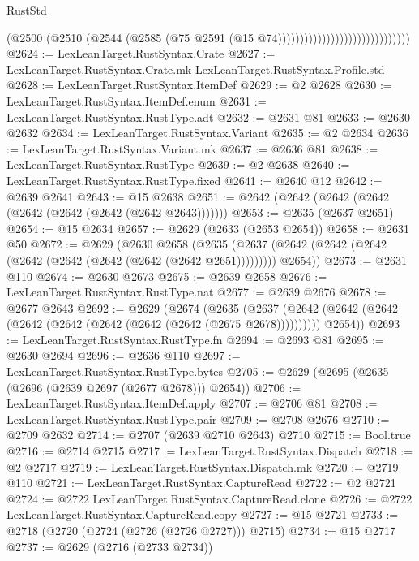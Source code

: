 \begin{lexlean}{RustStd}
\begin{coremodule}
{\begin{coremodule}
{{{{{{{{{{{{{{{{{{{{{{{{{{{{{{{{{                                                    (@2500
                                                      (@2510
                                                        (@2544
                                                          (@2585
                                                            (@75
                                                              @2591
                                                              (@15 @74))))))))))))))))))))))))))))))
@2624 := LexLeanTarget.RustSyntax.Crate
@2627 := LexLeanTarget.RustSyntax.Crate.mk LexLeanTarget.RustSyntax.Profile.std
@2628 := LexLeanTarget.RustSyntax.ItemDef
@2629 := @2 @2628
@2630 := LexLeanTarget.RustSyntax.ItemDef.enum
@2631 := LexLeanTarget.RustSyntax.RustType.adt
@2632 := @2631 @81
@2633 := @2630 @2632
@2634 := LexLeanTarget.RustSyntax.Variant
@2635 := @2 @2634
@2636 := LexLeanTarget.RustSyntax.Variant.mk
@2637 := @2636 @81
@2638 := LexLeanTarget.RustSyntax.RustType
@2639 := @2 @2638
@2640 := LexLeanTarget.RustSyntax.RustType.fixed
@2641 := @2640 @12
@2642 := @2639 @2641
@2643 := @15 @2638
@2651 := @2642 (@2642 (@2642 (@2642 (@2642 (@2642 (@2642 (@2642 @2643)))))))
@2653 := @2635 (@2637 @2651)
@2654 := @15 @2634
@2657 := @2629 (@2633 (@2653 @2654))
@2658 := @2631 @50
@2672 := @2629
    (@2630
      @2658
      (@2635 (@2637 (@2642 (@2642 (@2642 (@2642 (@2642 (@2642 (@2642 (@2642 @2651))))))))) @2654))
@2673 := @2631 @110
@2674 := @2630 @2673
@2675 := @2639 @2658
@2676 := LexLeanTarget.RustSyntax.RustType.nat
@2677 := @2639 @2676
@2678 := @2677 @2643
@2692 := @2629
    (@2674
      (@2635
        (@2637 (@2642 (@2642 (@2642 (@2642 (@2642 (@2642 (@2642 (@2642 (@2675 @2678))))))))))
        @2654))
@2693 := LexLeanTarget.RustSyntax.RustType.fn
@2694 := @2693 @81
@2695 := @2630 @2694
@2696 := @2636 @110
@2697 := LexLeanTarget.RustSyntax.RustType.bytes
@2705 := @2629 (@2695 (@2635 (@2696 (@2639 @2697 (@2677 @2678))) @2654))
@2706 := LexLeanTarget.RustSyntax.ItemDef.apply
@2707 := @2706 @81
@2708 := LexLeanTarget.RustSyntax.RustType.pair
@2709 := @2708 @2676
@2710 := @2709 @2632
@2714 := @2707 (@2639 @2710 @2643) @2710
@2715 := Bool.true
@2716 := @2714 @2715
@2717 := LexLeanTarget.RustSyntax.Dispatch
@2718 := @2 @2717
@2719 := LexLeanTarget.RustSyntax.Dispatch.mk
@2720 := @2719 @110
@2721 := LexLeanTarget.RustSyntax.CaptureRead
@2722 := @2 @2721
@2724 := @2722 LexLeanTarget.RustSyntax.CaptureRead.clone
@2726 := @2722 LexLeanTarget.RustSyntax.CaptureRead.copy
@2727 := @15 @2721
@2733 := @2718 (@2720 (@2724 (@2726 (@2726 @2727))) @2715)
@2734 := @15 @2717
@2737 := @2629 (@2716 (@2733 @2734))
}}}}}}}}}}}}}}}}}}}}}}}}}}}}}}}}}
\end{coremodule}}
\end{coremodule}
\end{lexlean}
